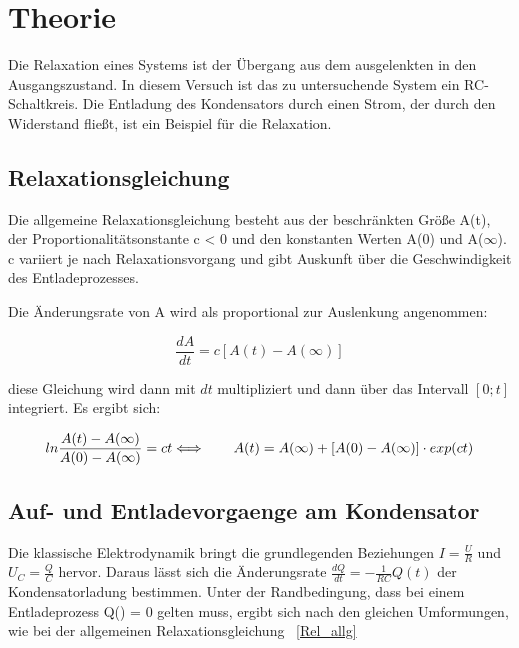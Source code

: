 \section{Theorie}
\label{sec:Theorie}

Die Relaxation eines Systems ist der Übergang aus dem ausgelenkten in den Ausgangszustand.
In diesem Versuch ist das zu untersuchende System ein RC-Schaltkreis.
Die Entladung des Kondensators durch einen Strom, der durch den Widerstand fließt, 
ist ein Beispiel für die Relaxation.

\subsection{Relaxationsgleichung}
\label{subsec:Die Relaxationsgleichung}

Die allgemeine Relaxationsgleichung besteht aus der beschränkten Größe A(t), der Proportionalitätsonstante c < 0 
und den konstanten
Werten A(0) und A($\infty$).
c variiert je nach Relaxationsvorgang und gibt Auskunft über die Geschwindigkeit des Entladeprozesses.

Die Änderungsrate von A wird als proportional zur Auslenkung angenommen:

\begin{equation} 
    \label{Rel_allg}

\frac{dA}{dt} = c[A(t)-A(\infty)]
    
\end{equation}

diese Gleichung wird dann mit $dt$ multipliziert und dann über das Intervall $[0; t]$ integriert. 
Es ergibt sich:

\begin{equation} 
    \label{Rel_RC}
    
ln\frac{A(t)-A(\infty)}{A(0)-A(\infty)} = ct \\

\Longleftrightarrow\qquad A(t) = A(\infty) + [A(0)-A(\infty)] \cdot exp(ct)

\end{equation}


\subsection{Auf- und Entladevorgaenge am Kondensator}
\label{subsec:Entladevorgaenge am Kondensator}

Die klassische Elektrodynamik bringt die grundlegenden Beziehungen $I = \frac{U}{R}$ und $U_C = \frac{Q}{C}$ 
hervor.
Daraus lässt sich die Änderungsrate $\frac{dQ}{dt} = -\frac{1}{RC}Q(t)$ der Kondensatorladung bestimmen. 
Unter der Randbedingung, dass bei einem Entladeprozess Q(\infty) = 0 gelten muss, ergibt sich nach den gleichen
Umformungen, wie bei der allgemeinen Relaxationsgleichung ~\eqref{Rel_allg}

